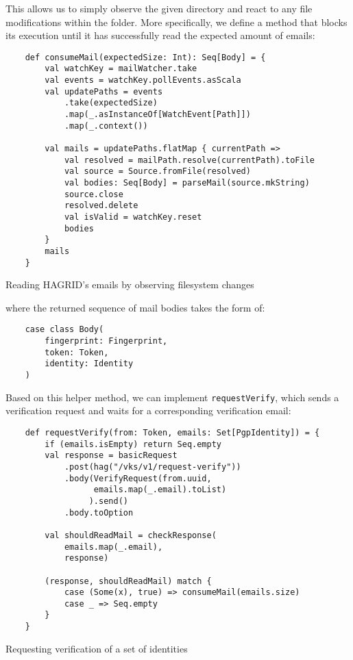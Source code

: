 This allows us to simply observe the given directory and react to any file modifications within the folder.
More specifically, we define a method that blocks its execution until it has successfully read the expected amount of emails: 
\begin{code}
    
    \begin{verbatim}
    def consumeMail(expectedSize: Int): Seq[Body] = {
        val watchKey = mailWatcher.take
        val events = watchKey.pollEvents.asScala
        val updatePaths = events
            .take(expectedSize)
            .map(_.asInstanceOf[WatchEvent[Path]])
            .map(_.context())
    
        val mails = updatePaths.flatMap { currentPath =>
            val resolved = mailPath.resolve(currentPath).toFile
            val source = Source.fromFile(resolved)
            val bodies: Seq[Body] = parseMail(source.mkString)
            source.close
            resolved.delete
            val isValid = watchKey.reset
            bodies
        }
        mails
    }
    \end{verbatim}
    \caption{Reading HAGRID's emails by observing filesystem changes}
    \label{code:consumeMail}
\end{code}

where the returned sequence of mail bodies takes the form of:
\begin{verbatim}
    case class Body(
        fingerprint: Fingerprint, 
        token: Token, 
        identity: Identity
    )
\end{verbatim}

Based on this helper method, we can implement \texttt{requestVerify}, which sends a verification request and waits for a corresponding verification email:
\begin{code}
    \begin{verbatim}
    def requestVerify(from: Token, emails: Set[PgpIdentity]) = {
        if (emails.isEmpty) return Seq.empty
        val response = basicRequest
            .post(hag("/vks/v1/request-verify"))
            .body(VerifyRequest(from.uuid, 
                  emails.map(_.email).toList)
                 ).send()
            .body.toOption

        val shouldReadMail = checkResponse(
            emails.map(_.email), 
            response)

        (response, shouldReadMail) match {
            case (Some(x), true) => consumeMail(emails.size)
            case _ => Seq.empty
        }
    }
    \end{verbatim}
    \caption{Requesting verification of a set of identities}
\end{code}

